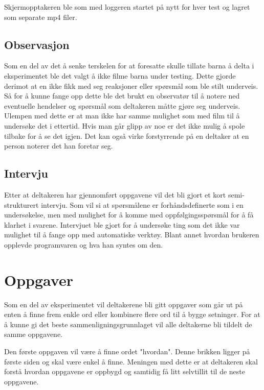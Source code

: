  
Skjermopptakeren ble som med loggeren startet på nytt for hver test og lagret som separate mp4 filer.  
 
 
 
 
\subsection{Observasjon} 
 
 
Som en del av det å senke terskelen for at foresatte skulle tillate barna å delta i eksperimentet ble det valgt å ikke filme barna under testing. Dette gjorde derimot at en ikke fikk med seg reaksjoner eller spørsmål som ble stilt underveis. Så for å kunne fange opp dette ble det brukt en observatør til å notere ned eventuelle hendelser og spørsmål som deltakeren måtte gjøre seg underveis. Ulempen med dette er at man ikke har samme mulighet som med film til å undersøke det i ettertid. Hvis man går glipp av noe er det ikke mulig å spole tilbake for å se det igjen. Det kan også virke forstyrrende på en deltaker at en person noterer det han foretar seg.  
 
 
 
 
 
 
\subsection{Intervju} 
 
 
Etter at deltakeren har gjennomført oppgavene vil det bli gjort et kort semi-strukturert intervju. Som vil si at spørsmålene er forhåndsdefinerte som i en undersøkelse, men med mulighet for å komme med oppfølgingsspørsmål for å få klarhet i svarene. Intervjuet ble gjort for å undersøke ting som det ikke var mulighet til å fange opp med automatiske verktøy. Blant annet hvordan brukeren opplevde programvaren og hva han syntes om den. 
 
 
 
 
\section{Oppgaver} 
 
 
Som en del av eksperimentet vil deltakerene bli gitt oppgaver som går ut på enten å finne frem enkle ord eller kombinere flere ord til å bygge setninger. For at å kunne gi det beste sammenligningsgrunnlaget vil alle deltakerne bli tildelt de samme oppgavene. 
 
 
Den første oppgaven vil være å finne ordet "hvordan". Denne brikken ligger på første siden og skal være enkel å finne. Meningen med dette er at deltakeren skal forstå hvordan oppgavene er oppbygd og samtidig få litt selvtillit til de neste oppgavene. 
 
